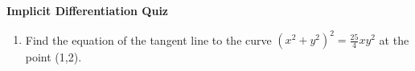 \documentclass[11pt]{article}
\begin{document}

\centerline{\textbf{\Large{Implicit Differentiation Quiz}}}

\vspace{0.2in}
 
\begin{enumerate}  
\item Find the equation of the tangent line to the curve $(x^2 + y^2)^2 = \frac{25}{4}xy^2$ at the point (1,2).

\end{enumerate}
\end{document}
